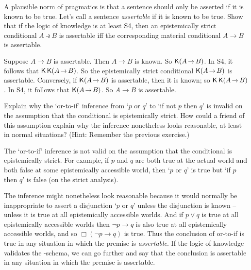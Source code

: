 
\begin{exercise}
  A plausible norm of pragmatics is that a sentence should only be asserted if
  it is known to be true. Let's call a sentence \emph{assertable} if it is known
  to be true. Show that if the logic of knowledge is at least S4, then an
  epistemically strict conditional $A \strictif B$ is assertable iff the
  corresponding material conditional $A \to B$ is assertable.
\end{exercise}
\begin{solution}
  Suppose $A \to B$ is assertable. Then $A\to B$ is known. So $\Kn (A \to
  B)$. In S4, it follows that $\Kn\Kn(A \to B)$. So the epistemically strict
  conditional $\Kn(A \to B)$ is assertable. Conversely, if $\Kn(A \to B)$ is
  assertable, then it is known; so $\Kn\Kn(A \to B)$. In S4, it follows that
  $\Kn(A \to B)$. So $A \to B$ is assertable.
\end{solution}

\begin{exercise}
  Explain why the `or-to-if' inference from `$p$ or $q$' to `if not $p$ then
  $q$' is invalid on the assumption that the conditional is epistemically
  strict. How could a friend of this assumption explain why the inference
  nonetheless looks reasonable, at least in normal situations? (Hint: Remember
  the previous exercise.)
\end{exercise}
\begin{solution}
  The `or-to-if' inference is not valid on the assumption that the conditional
  is epistemically strict. For example, if $p$ and $q$ are both true at the actual world and both false at some epistemically accessible world, then `$p$ or $q$' is true but `if $p$ then $q$' is false (on the strict analysis).

  The inference might nonetheless look reasonable because it would normally be
  inappropriate to assert a disjunction `$p$ or $q$' unless the disjunction is
  known -- unless it is true at all epistemically accessible worlds. And if
  $p \lor q$ is true at all epistemically accessible worlds then $\neg p \to q$
  is also true at all epistemically accessible worlds, and so $\Box(\neg p \to q)$ is
  true. Thus the conclusion of or-to-if is true in any situation in which the
  premise is \emph{assertable}. If the logic of knowledge validates the
  -schema, we can go further and say that the conclusion is assertable in
  any situation in which the premise is assertable.
\end{solution}

